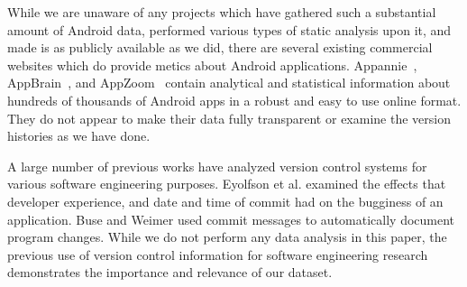 


While we are unaware of any projects which have gathered such a substantial amount of Android data, performed various types of static analysis upon it, and made is as publicly available as we did, there are several existing commercial websites which do provide metics about Android applications. Appannie~\cite{appAnnie_url}, AppBrain~\cite{appbrain_url}, and AppZoom~\cite{appzoom_url} contain analytical and statistical information about hundreds of thousands of Android apps in a  robust and easy to use online format. They do not appear to make their data fully transparent or examine the version histories as we have done.

A large number of previous works have analyzed version control systems for various software engineering purposes. Eyolfson et al.\cite{Eyolfson:2011:TDD:1985441.1985464} examined the effects that developer experience, and date and time of commit had on the bugginess of an application. Buse and Weimer\cite{Buse:2010:ADP:1858996.1859005} used commit messages to automatically document program changes. While we do not perform any data analysis in this paper, the previous use of version control information for software engineering research demonstrates the importance and relevance of our dataset.
